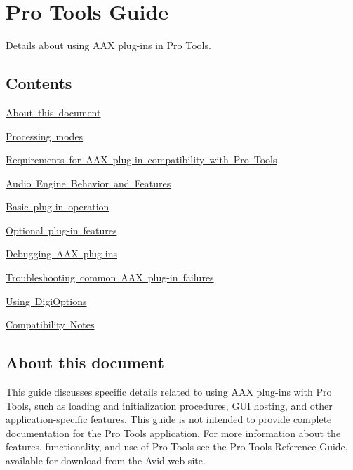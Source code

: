 \hypertarget{a00830}{}\section{Pro Tools Guide}
\label{a00830}
Details about using A\+AX plug-\/ins in Pro Tools. 

\hypertarget{a00830_aax_pro_tools_guide_contents}{}\subsection{Contents}\label{a00830_aax_pro_tools_guide_contents}
\begin{DoxyItemize}
\item \mbox{\hyperlink{a00830_aax_pro_tools_guide_00_about_this_document}{About this document}} \item \mbox{\hyperlink{a00830_aax_pro_tools_guide_01_processing_modes}{Processing modes}} \item \mbox{\hyperlink{a00830_aax_pro_tools_guide_02_requirements_for_aax_plugin_compatibility_with_pro_tools}{Requirements for A\+AX plug-\/in compatibility with Pro Tools}} \item \mbox{\hyperlink{a00830_aax_pro_tools_guide_03_audio_engine_behavior}{Audio Engine Behavior and Features}} \item \mbox{\hyperlink{a00830_aax_pro_tools_guide_04_basic_plugin_operation}{Basic plug-\/in operation}} \item \mbox{\hyperlink{a00830_aax_pro_tools_guide_05_optional_plugin_features}{Optional plug-\/in features}} \item \mbox{\hyperlink{a00830_aax_pro_tools_guide_06_debugging_aax_plugins}{Debugging A\+AX plug-\/ins}} \item \mbox{\hyperlink{a00830_aax_pro_tools_guide_06b_troubleshooting_aax_plugin_failures}{Troubleshooting common A\+AX plug-\/in failures}} \item \mbox{\hyperlink{a00830_aax_pro_tools_guide_06c_digioptions}{Using Digi\+Options}} \item \mbox{\hyperlink{a00830_aax_pro_tools_guide_07_compatibility_notes}{Compatibility Notes}}\end{DoxyItemize}
 \hypertarget{a00830_aax_pro_tools_guide_00_about_this_document}{}\subsection{About this document}\label{a00830_aax_pro_tools_guide_00_about_this_document}
This guide discusses specific details related to using A\+AX plug-\/ins with Pro Tools, such as loading and initialization procedures, G\+UI hosting, and other application-\/specific features. This guide is not intended to provide complete documentation for the Pro Tools application. For more information about the features, functionality, and use of Pro Tools see the Pro Tools Reference Guide, available for download from the Avid web site.

